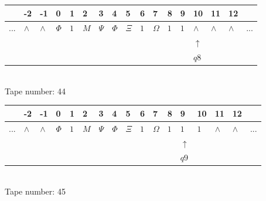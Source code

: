 \documentclass[11pt]{article}
\begin{document}
\begin{table}[H]
\centering
\begin{tabular}{lllllllllllllllll}
 & -2 & -1 & 0 & 1 & 2 & 3 & 4 & 5 & 6 & 7 & 8 & 9 & 10 & 11 & 12 & \\
\hline
$...$ & \multicolumn{1}{|l|}{$\wedge$} & \multicolumn{1}{|l|}{$\wedge$} & \multicolumn{1}{|l|}{$\Phi$} & \multicolumn{1}{|l|}{$1$} & \multicolumn{1}{|l|}{$M$} & \multicolumn{1}{|l|}{$\Psi$} & \multicolumn{1}{|l|}{$\Phi$} & \multicolumn{1}{|l|}{$\Xi$} & \multicolumn{1}{|l|}{$1$} & \multicolumn{1}{|l|}{$\Omega$} & \multicolumn{1}{|l|}{$1$} & \multicolumn{1}{|l|}{$1$} & \multicolumn{1}{|l|}{$\wedge$} & \multicolumn{1}{|l|}{$\wedge$} & \multicolumn{1}{|l|}{$\wedge$} & $...$\\
\hline
&  &  &  &  &  &  &  &  &  &  &  &  & $\uparrow$ &  &  &  \\
&  &  &  &  &  &  &  &  &  &  &  &  & $ q8 $ &  &  &  \\
\end{tabular}
\\
Tape number: 44
\noindent\makebox[\linewidth]{\hdashrule{\textwidth}{1pt}{1pt}}\end{table}

\begin{table}[H]
\centering
\begin{tabular}{lllllllllllllllll}
 & -2 & -1 & 0 & 1 & 2 & 3 & 4 & 5 & 6 & 7 & 8 & 9 & 10 & 11 & 12 & \\
\hline
$...$ & \multicolumn{1}{|l|}{$\wedge$} & \multicolumn{1}{|l|}{$\wedge$} & \multicolumn{1}{|l|}{$\Phi$} & \multicolumn{1}{|l|}{$1$} & \multicolumn{1}{|l|}{$M$} & \multicolumn{1}{|l|}{$\Psi$} & \multicolumn{1}{|l|}{$\Phi$} & \multicolumn{1}{|l|}{$\Xi$} & \multicolumn{1}{|l|}{$1$} & \multicolumn{1}{|l|}{$\Omega$} & \multicolumn{1}{|l|}{$1$} & \multicolumn{1}{|l|}{$1$} & \multicolumn{1}{|l|}{$1$} & \multicolumn{1}{|l|}{$\wedge$} & \multicolumn{1}{|l|}{$\wedge$} & $...$\\
\hline
&  &  &  &  &  &  &  &  &  &  &  & $\uparrow$ &  &  &  &  \\
&  &  &  &  &  &  &  &  &  &  &  & $ q9 $ &  &  &  &  \\
\end{tabular}
\\
Tape number: 45
\noindent\makebox[\linewidth]{\hdashrule{\textwidth}{1pt}{1pt}}\end{table}
\end{document}
